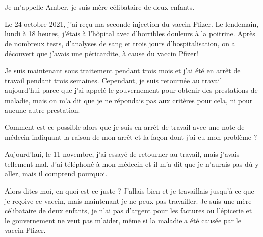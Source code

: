 Je m'appelle Amber, je suis mère célibataire de deux enfants.

Le 24 octobre 2021, j'ai reçu ma seconde injection du vaccin Pfizer. Le
lendemain, lundi à 18 heures, j'étais à l'hôpital avec d'horribles douleurs à la
poitrine. Après de nombreux tests, d'analyses de sang et trois jours
d'hospitalisation, on a découvert que j'avais une péricardite, à cause du vaccin
Pfizer!

Je suis maintenant sous traitement pendant trois mois et j'ai été en arrêt de
travail pendant trois semaines. Cependant, je suis retournée au travail
aujourd'hui parce que j'ai appelé le gouvernement pour obtenir des prestations
de maladie, mais on m'a dit que je ne répondais pas aux critères pour cela, ni
pour aucune autre prestation.

Comment est-ce possible alors que je suis en arrêt de travail avec une note de
médecin indiquant la raison de mon arrêt et la façon dont j'ai eu mon problème ?

Aujourd'hui, le 11 novembre, j'ai essayé de retourner au travail, mais j'avais
tellement mal. J'ai téléphoné à mon médecin et il m'a dit que je n'aurais pas dû
y aller, mais il comprend pourquoi.

Alors dites-moi, en quoi est-ce juste ? J'allais bien et je travaillais jusqu'à
ce que je reçoive ce vaccin, mais maintenant je ne peux pas travailler. Je suis
une mère célibataire de deux enfants, je n'ai pas d'argent pour les factures ou
l'épicerie et le gouvernement ne veut pas m'aider, même si la maladie a été
causée par le vaccin Pfizer.
